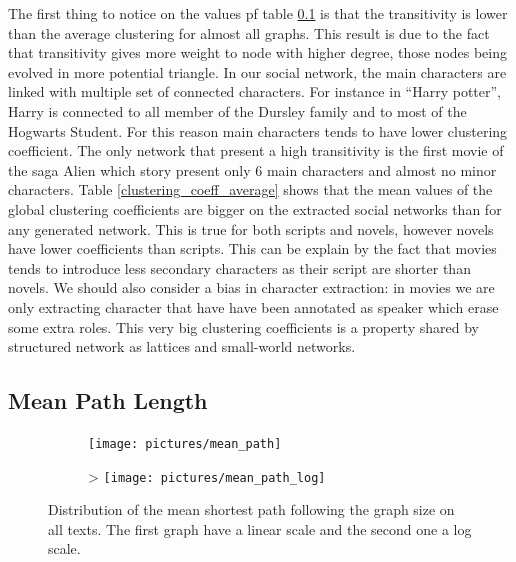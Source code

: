 \documentclass[a4paper, 12pt]{report}
\begin{document}
The first thing to notice on the values pf table \ref{} is that the transitivity is lower than the average clustering for almost all graphs. This result is due to the fact that transitivity gives more weight to node with higher degree, those nodes being evolved in more potential triangle. In our social network, the main characters are linked with multiple set of connected characters. For instance in ``Harry potter'', Harry is connected to all member of the Dursley family and to most of the Hogwarts Student. For this reason main characters tends to have lower clustering coefficient. The only network that present a high transitivity is the first movie of the saga Alien which story present only 6 main characters and almost no minor characters. Table \ref{clustering_coeff_average} shows that the mean values of the global clustering coefficients are bigger on the extracted social networks than for any generated network. This is true for both scripts and novels, however novels have lower coefficients than scripts. This can be explain by the fact that movies tends to introduce less secondary characters as their script are shorter than novels. We should also consider a bias in character extraction: in movies we are only extracting character that have have been annotated as speaker which erase some extra roles. This very big clustering coefficients is a property shared by structured network as lattices and small-world networks.  \\


\subsection{Mean Path Length}
\begin{figure}
\begin{subfigure}{.49\textwidth}
\centering
\texttt{[image: pictures/mean\_path]}
\end{subfigure}
\hfill
\begin{subfigure}{.49\textwidth}>
\centering
\texttt{[image: pictures/mean\_path\_log]}
\end{subfigure}
\caption{Distribution of the mean shortest path following the graph size on all texts. The first graph have a linear scale and the second one a log scale. }
\label{mean_path}
\end{figure}
\end{document}
